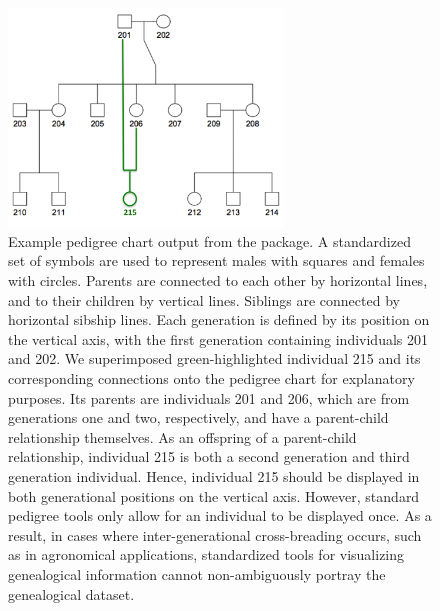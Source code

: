 \documentclass[article,shortnames]{jss}
\begin{document}
\begin{figure}[h]
    \centering
    \includegraphics[width=0.65\textwidth]{kinshipFig}
    \caption{Example pedigree chart output from the  package. A standardized set of symbols are used to represent males with squares and females with circles. Parents are connected to each other by horizontal lines, and to their children by vertical lines. Siblings are connected by horizontal sibship lines. Each generation is defined by its position on the vertical axis, with the first generation containing individuals 201 and 202. We superimposed green-highlighted individual 215 and its corresponding connections onto the pedigree chart for explanatory purposes. Its parents are individuals 201 and 206, which are from generations one and two, respectively, and have a parent-child relationship themselves. As an offspring of a parent-child relationship, individual 215 is both a second generation and third generation individual. Hence, individual 215 should be displayed in both generational positions on the vertical axis. However, standard pedigree tools only allow for an individual to be displayed once. As a result, in cases where inter-generational cross-breading occurs, such as in agronomical applications, standardized tools for visualizing genealogical information cannot non-ambiguously portray the genealogical dataset.}
    \label{fig:kinshipFig}
\end{figure}
\end{document}
